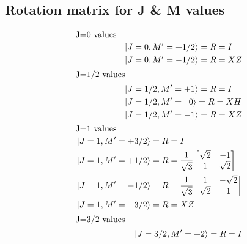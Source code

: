 \subsection{Rotation matrix for J \& M values}
\begin{subequations}
\begin{align}
\intertext{J=0 values}
\begin{split}
&\ket{J=0, M'=+1/2} = R = I \\
&\ket{J=0, M'=-1/2} = R = XZ \\
\end{split} \\ 
\intertext{J=1/2 values}
\begin{split}
&\ket{J=1/2, M'=+1} = R = I \\
&\ket{J=1/2, M'=\;\;0} = R = XH \\
&\ket{J=1/2, M'=-1} = R = XZ \\
\end{split} \\ 
\intertext{J=1 values}
\begin{split}
&\ket{J=1, M'=+3/2} = R = I \\
%
&\ket{J=1, M'=+1/2} = R = 
\frac{1}{\sqrt{3}}
\begin{bmatrix}
\rtwo &-1 \\
1 & \rtwo \\
\end{bmatrix} \\
%
&\ket{J=1, M'=-1/2} = R = 
\frac{1}{\sqrt{3}}
\begin{bmatrix}
1 &-\rtwo \\
\rtwo & 1 \\
\end{bmatrix} \\
%
&\ket{J=1, M'=-3/2} = R = XZ \\
\end{split} \\ 
\intertext{J=3/2 values}
\begin{split}
&\ket{J=3/2, M'=+2} = R = I \\

\end{split}
\end{align}
\end{subequations}
